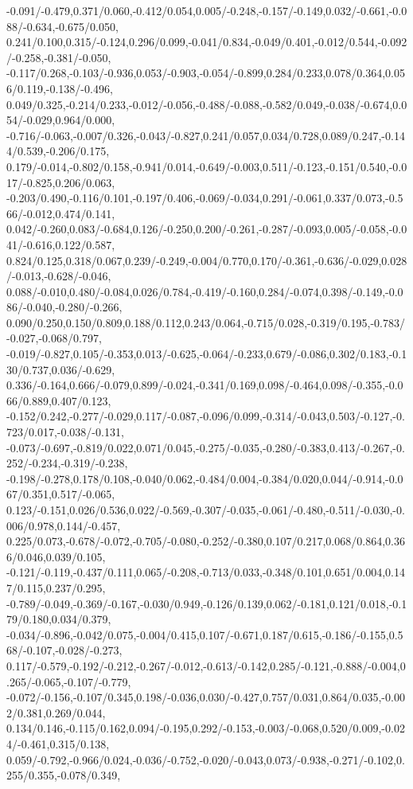 {-0.091/-0.479,0.371/0.060,-0.412/0.054,0.005/-0.248,-0.157/-0.149,0.032/-0.661,-0.088/-0.634,-0.675/0.050,%
0.241/0.100,0.315/-0.124,0.296/0.099,-0.041/0.834,-0.049/0.401,-0.012/0.544,-0.092/-0.258,-0.381/-0.050,%
-0.117/0.268,-0.103/-0.936,0.053/-0.903,-0.054/-0.899,0.284/0.233,0.078/0.364,0.056/0.119,-0.138/-0.496,%
0.049/0.325,-0.214/0.233,-0.012/-0.056,-0.488/-0.088,-0.582/0.049,-0.038/-0.674,0.054/-0.029,0.964/0.000,%
-0.716/-0.063,-0.007/0.326,-0.043/-0.827,0.241/0.057,0.034/0.728,0.089/0.247,-0.144/0.539,-0.206/0.175,%
0.179/-0.014,-0.802/0.158,-0.941/0.014,-0.649/-0.003,0.511/-0.123,-0.151/0.540,-0.017/-0.825,0.206/0.063,%
-0.203/0.490,-0.116/0.101,-0.197/0.406,-0.069/-0.034,0.291/-0.061,0.337/0.073,-0.566/-0.012,0.474/0.141,%
0.042/-0.260,0.083/-0.684,0.126/-0.250,0.200/-0.261,-0.287/-0.093,0.005/-0.058,-0.041/-0.616,0.122/0.587,%
0.824/0.125,0.318/0.067,0.239/-0.249,-0.004/0.770,0.170/-0.361,-0.636/-0.029,0.028/-0.013,-0.628/-0.046,%
0.088/-0.010,0.480/-0.084,0.026/0.784,-0.419/-0.160,0.284/-0.074,0.398/-0.149,-0.086/-0.040,-0.280/-0.266,%
0.090/0.250,0.150/0.809,0.188/0.112,0.243/0.064,-0.715/0.028,-0.319/0.195,-0.783/-0.027,-0.068/0.797,%
-0.019/-0.827,0.105/-0.353,0.013/-0.625,-0.064/-0.233,0.679/-0.086,0.302/0.183,-0.130/0.737,0.036/-0.629,%
0.336/-0.164,0.666/-0.079,0.899/-0.024,-0.341/0.169,0.098/-0.464,0.098/-0.355,-0.066/0.889,0.407/0.123,%
-0.152/0.242,-0.277/-0.029,0.117/-0.087,-0.096/0.099,-0.314/-0.043,0.503/-0.127,-0.723/0.017,-0.038/-0.131,%
-0.073/-0.697,-0.819/0.022,0.071/0.045,-0.275/-0.035,-0.280/-0.383,0.413/-0.267,-0.252/-0.234,-0.319/-0.238,%
-0.198/-0.278,0.178/0.108,-0.040/0.062,-0.484/0.004,-0.384/0.020,0.044/-0.914,-0.067/0.351,0.517/-0.065,%
0.123/-0.151,0.026/0.536,0.022/-0.569,-0.307/-0.035,-0.061/-0.480,-0.511/-0.030,-0.006/0.978,0.144/-0.457,%
0.225/0.073,-0.678/-0.072,-0.705/-0.080,-0.252/-0.380,0.107/0.217,0.068/0.864,0.366/0.046,0.039/0.105,%
-0.121/-0.119,-0.437/0.111,0.065/-0.208,-0.713/0.033,-0.348/0.101,0.651/0.004,0.147/0.115,0.237/0.295,%
-0.789/-0.049,-0.369/-0.167,-0.030/0.949,-0.126/0.139,0.062/-0.181,0.121/0.018,-0.179/0.180,0.034/0.379,%
-0.034/-0.896,-0.042/0.075,-0.004/0.415,0.107/-0.671,0.187/0.615,-0.186/-0.155,0.568/-0.107,-0.028/-0.273,%
0.117/-0.579,-0.192/-0.212,-0.267/-0.012,-0.613/-0.142,0.285/-0.121,-0.888/-0.004,0.265/-0.065,-0.107/-0.779,%
-0.072/-0.156,-0.107/0.345,0.198/-0.036,0.030/-0.427,0.757/0.031,0.864/0.035,-0.002/0.381,0.269/0.044,%
0.134/0.146,-0.115/0.162,0.094/-0.195,0.292/-0.153,-0.003/-0.068,0.520/0.009,-0.024/-0.461,0.315/0.138,%
0.059/-0.792,-0.966/0.024,-0.036/-0.752,-0.020/-0.043,0.073/-0.938,-0.271/-0.102,0.255/0.355,-0.078/0.349,%
}
